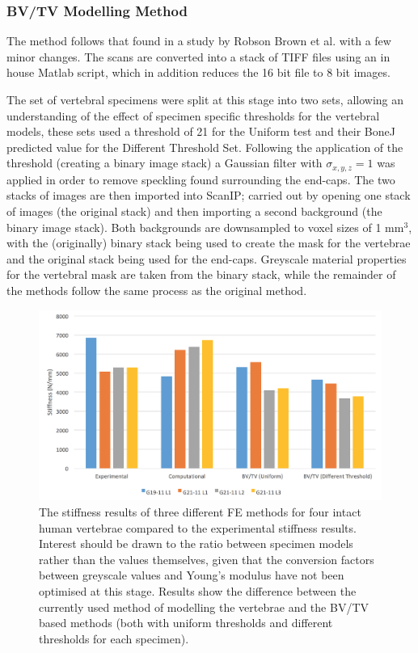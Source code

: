 \subsubsection{BV/TV Modelling Method}

The method follows that found in a study by Robson Brown et al.
\cite{RobsonBrown2014} with a few minor changes. The scans are converted into a
stack of TIFF files using an in house Matlab script, which in addition reduces
the 16 bit file to 8 bit images.



The set of vertebral specimens were split at this stage into two sets, allowing
an understanding of the effect of specimen specific thresholds for the vertebral
models, these sets used a threshold of 21 for the Uniform test and their BoneJ
predicted value for the Different Threshold Set. Following the application of
the threshold (creating a binary image stack) a Gaussian filter with $
\sigma_{x,y,z} = 1 $ was applied in order to remove speckling found surrounding
the end-caps. The two stacks of images are then imported into ScanIP; carried
out by opening one stack of images (the original stack) and then importing a
second background (the binary image stack). Both backgrounds are downsampled to
voxel sizes of 1 mm$^3$, with the (originally) binary stack being used to create
the mask for the vertebrae and the original stack being used for the end-caps.
Greyscale material properties for the vertebral mask are taken from the binary
stack, while the remainder of the methods follow the same process as the
original method.

\begin{figure}[ht]
  \centering
  \includegraphics[width=6in]{Chapters/Chapter_HT_images/diffModellingMethods.png}
  \caption{The stiffness results of three different FE methods for four intact
    human vertebrae compared to the experimental stiffness results. Interest
    should be drawn to the ratio between specimen models rather than the values
    themselves, given that the conversion factors between greyscale values and
    Young's modulus have not been optimised at this stage. Results show the
    difference between the currently used method of modelling the vertebrae and
    the BV/TV based methods (both with uniform thresholds and different
    thresholds for each specimen).}
  \label{fig:diffModellingMethods}
\end{figure}




